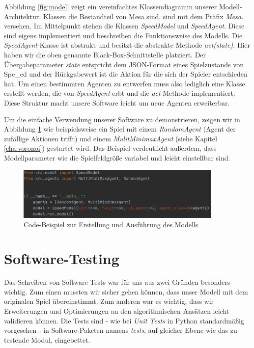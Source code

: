 Abbildung \ref{fig:model} zeigt ein vereinfachtes Klassendiagramm unserer Modell-Architektur. Klassen die Bestandteil von Mesa sind, sind mit dem Präfix \textit{Mesa.} versehen. Im Mittelpunkt stehen die Klassen \textit{SpeedModel} und \textit{SpeedAgent}. Diese sind eigens implementiert und beschreiben die Funktionsweise des Modells. Die  \textit{SpeedAgent}-Klasse ist abstrakt und besitzt die abstrakte Methode \textit{act(state)}. Hier haben wir die oben genannte Black-Box-Schnittstelle platziert. Der Übergabeparameter \textit{state} entspricht dem JSON-Format eines Spielzustands von Spe\_ed und der Rückgabewert ist die Aktion für die sich der Spieler entschieden hat. Um einen bestimmten Agenten zu entwerfen muss also lediglich eine Klasse erstellt werden, die von  \textit{SpeedAgent} erbt und die  \textit{act}-Methode implementiert. Diese Struktur macht unsere Software leicht um neue Agenten erweiterbar.

Um die einfache Verwendung unserer Software zu demonstrieren, zeigen wir in Abbildung \ref{fig:model_code} wie beispielsweise ein Spiel mit einem \textit{RandomAgent} (Agent der zufällige Aktionen trifft) und einem \textit{MulitMinimaxAgent} (siehe Kapitel \ref{cha:voronoi}) gestartet wird. Das Beispiel verdeutlicht außerdem, dass Modellparameter wie die Spielfeldgröße variabel und leicht einstellbar sind.

\begin{figure}[ht]
    \centering
    \includegraphics[width=0.9\textwidth]{img/model_code.PNG}
    \caption{Code-Beispiel zur Erstellung und Ausführung des Modells}
	\label{fig:model_code}
\end{figure}


\section{Software-Testing}
\label{sec:testing}

Das Schreiben von Software-Tests war für uns aus zwei Gründen besonders wichtig. Zum einen mussten wir sicher gehen können, dass unser Modell mit dem originalen Spiel übereinstimmt. Zum anderen war es wichtig, dass wir Erweiterungen und Optimierungen an den algorithmischen Ansätzen leicht validieren können. Die Tests sind - wie bei \textit{Unit Tests} in Python standardmäßig vorgesehen - in Software-Paketen namens \textit{tests}, auf gleicher Ebene wie das zu testende Modul, eingebettet.

